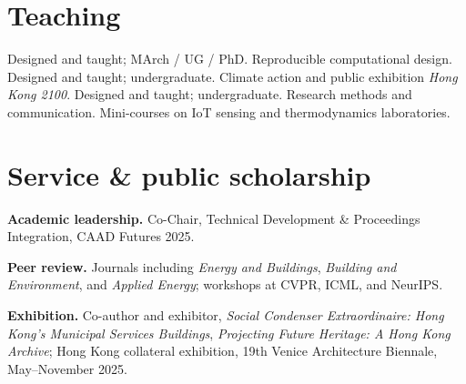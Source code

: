 \section{Teaching}
  {Designed and taught; MArch / UG / PhD. Reproducible computational design.}
  {Designed and taught; undergraduate. Climate action and public exhibition \emph{Hong Kong 2100}.}
  {Designed and taught; undergraduate. Research methods and communication.}
  {Mini-courses on IoT sensing and thermodynamics laboratories.}

\section{Service \& public scholarship}
\textbf{Academic leadership.} Co-Chair, Technical Development \& Proceedings Integration,
CAAD Futures 2025.\par
\textbf{Peer review.} Journals including \emph{Energy and Buildings},
\emph{Building and Environment}, and \emph{Applied Energy}; workshops at CVPR, ICML, and NeurIPS.\par
\textbf{Exhibition.} Co-author and exhibitor, \emph{Social Condenser Extraordinaire:
Hong Kong's Municipal Services Buildings}, \emph{Projecting Future Heritage:
A Hong Kong Archive}; Hong Kong collateral exhibition, 19th Venice Architecture
Biennale, May--November 2025.
